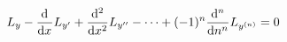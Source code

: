 \item[Euler Equation]
  $$L_y-\od{}{x}L_{y'}+\od[2]{}{x}L_{y''}-\cdots+(-1)^n\od[n]{}{n}L_{y^{(n)}}=0$$
